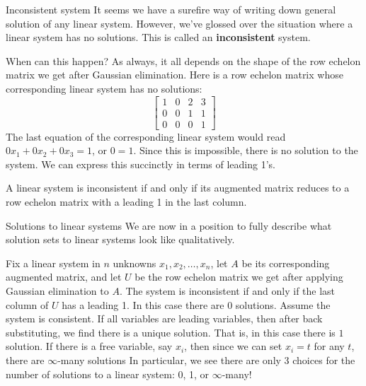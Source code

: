 \begin{frame}{Inconsistent system}
\footnotesize
It seems we have a surefire way of writing down general solution of any linear system. 
\bpause However, we've glossed over the situation where a linear system has \alert{no solutions}. This is called an {\bf inconsistent} system. 

\bpause When can this happen? As always, it all depends on the shape of the row echelon matrix we get after Gaussian elimination. Here is a row echelon matrix whose corresponding linear system has no solutions:
\[
\begin{bmatrix}
\boxed{1}&0&2&3\\
0&0&\boxed{1}&1\\
0&0&0&\boxed{1}
\end{bmatrix}
\]
\pause The last equation of the corresponding linear system would read $0x_1+0x_2+0x_3=1$, or $0=1$. Since this is impossible, there is no solution to the system. 
\bpause We can express this succinctly in terms of leading 1's. 
\begin{theorem}A linear system is inconsistent if and only if its augmented matrix reduces to a row echelon matrix with a leading 1 in the \alert{last column}. 
\end{theorem}
\end{frame}
\begin{frame}{Solutions to linear systems}
\bpause
We are now in a position to fully describe what solution sets to linear systems look like qualitatively. 

\pause 
\begin{theorem}
Fix a linear system in $n$ unknowns $x_1,x_2, \dots, x_n$, let $A$ be its corresponding augmented matrix, and let $U$ be the row echelon matrix we get after applying Gaussian elimination to $A$. 
\bb
\pause\ii The system is inconsistent if and only if the \alert{last column} of $U$ has a leading 1. In this case there are $\boxed{0}$ solutions. 
\pause\ii Assume the system is consistent. 
\bb
\pause\ii If all variables are leading variables, then after back substituting, we find there is a unique solution. That is, in this case there is $\boxed{1}$ solution.  
\pause\ii If there is a free variable, say $x_i$, then since we can set $x_i=t$ for any $t$, there are $\boxed{\infty}$-many solutions
\ee   
\ee
\pause In particular, we see there are only 3 choices for the \alert{number of solutions} to a linear system: 0, 1, or $\infty$-many! \end{theorem}
\end{frame}
